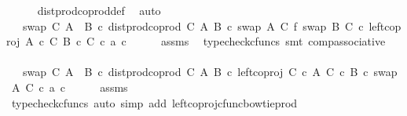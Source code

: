 \begin{isabellebody}
\ \ \ \ \isamarkupfalse%
\ dist{\isacharunderscore}{\kern0pt}prod{\isacharunderscore}{\kern0pt}coprod{}{\isacharunderscore}{\kern0pt}def\ \isamarkupfalse%
\ auto\isanewline
\ \ \isamarkupfalse%
\ \isamarkupfalse%
\ {\isachardoublequoteopen}{\isachardot}{\kern0pt}{\isachardot}{\kern0pt}{\isachardot}{\kern0pt}\ {\isacharequal}{\kern0pt}\ swap\ C\ {\isacharparenleft}{\kern0pt}A\ {\isasymCoprod}\ B{\isacharparenright}{\kern0pt}\ {\isasymcirc}\isactrlsub c\ dist{\isacharunderscore}{\kern0pt}prod{\isacharunderscore}{\kern0pt}coprod\ C\ A\ B\ {\isasymcirc}\isactrlsub c\ {\isacharparenleft}{\kern0pt}{\isacharparenleft}{\kern0pt}swap\ A\ C\ {\isasymbowtie}\isactrlsub f\ swap\ B\ C{\isacharparenright}{\kern0pt}\ {\isasymcirc}\isactrlsub c\ left{\isacharunderscore}{\kern0pt}coproj\ {\isacharparenleft}{\kern0pt}A\ {\isasymtimes}\isactrlsub c\ C{\isacharparenright}{\kern0pt}\ {\isacharparenleft}{\kern0pt}B\ {\isasymtimes}\isactrlsub c\ C{\isacharparenright}{\kern0pt}{\isacharparenright}{\kern0pt}\ {\isasymcirc}\isactrlsub c\ {\isasymlangle}a{\isacharcomma}{\kern0pt}\ c{\isasymrangle}{\isachardoublequoteclose}\isanewline
\ \ \ \ \isamarkupfalse%
\ assms\ \isamarkupfalse%
\ {\isacharparenleft}{\kern0pt}typecheck{\isacharunderscore}{\kern0pt}cfuncs{\isacharcomma}{\kern0pt}\ smt\ comp{\isacharunderscore}{\kern0pt}associative{}{\isacharparenright}{\kern0pt}\isanewline
\ \ \isamarkupfalse%
\ \isamarkupfalse%
\ {\isachardoublequoteopen}{\isachardot}{\kern0pt}{\isachardot}{\kern0pt}{\isachardot}{\kern0pt}\ {\isacharequal}{\kern0pt}\ swap\ C\ {\isacharparenleft}{\kern0pt}A\ {\isasymCoprod}\ B{\isacharparenright}{\kern0pt}\ {\isasymcirc}\isactrlsub c\ dist{\isacharunderscore}{\kern0pt}prod{\isacharunderscore}{\kern0pt}coprod\ C\ A\ B\ {\isasymcirc}\isactrlsub c\ {\isacharparenleft}{\kern0pt}left{\isacharunderscore}{\kern0pt}coproj\ {\isacharparenleft}{\kern0pt}C\ {\isasymtimes}\isactrlsub c\ A{\isacharparenright}{\kern0pt}\ {\isacharparenleft}{\kern0pt}C\ {\isasymtimes}\isactrlsub c\ B{\isacharparenright}{\kern0pt}\ {\isasymcirc}\isactrlsub c\ swap\ A\ C{\isacharparenright}{\kern0pt}\ {\isasymcirc}\isactrlsub c\ {\isasymlangle}a{\isacharcomma}{\kern0pt}\ c{\isasymrangle}{\isachardoublequoteclose}\isanewline
\ \ \ \ \isamarkupfalse%
\ assms\ \isamarkupfalse%
\ {\isacharparenleft}{\kern0pt}typecheck{\isacharunderscore}{\kern0pt}cfuncs{\isacharcomma}{\kern0pt}\ auto\ simp\ add{\isacharcolon}{\kern0pt}\ left{\isacharunderscore}{\kern0pt}coproj{\isacharunderscore}{\kern0pt}cfunc{\isacharunderscore}{\kern0pt}bowtie{\isacharunderscore}{\kern0pt}prod{\isacharparenright}{\kern0pt}\isanewline

\end{isabellebody}
